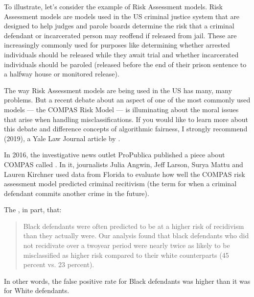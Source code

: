 \documentclass[letterpaper,10pt,english]{jupyterBook}
\begin{document}
\sphinxAtStartPar
To illustrate, let’s consider the example of Risk Assessment models. Risk Assessment models are models used in the US criminal justice system that are designed to help judges and parole boards determine the risk that a criminal defendant or incarcerated person may re\sphinxhyphen{}offend if released from jail. These are increasingly commonly used for purposes like determining whether arrested individuals should be released while they await trial and whether incarcerated individuals should be paroled (released before the end of their prison sentence to a half\sphinxhyphen{}way house or monitored release).

\sphinxAtStartPar
The way Risk Assessment models are being used in the US has many, many problems. But a recent debate about an aspect of one of the most commonly used models — the COMPAS Risk Model — is illuminating about the moral issues that arise when handling misclassifications. If you would like to learn more about this debate and difference concepts of algorithmic fairness, I strongly recommend  (2019), a Yale Law Journal article by .

\sphinxAtStartPar
In 2016, the investigative news outlet ProPublica published a piece about COMPAS called . In it, journalists Julia Angwin, Jeff Larson, Surya Mattu and Lauren Kirchner used data from Florida to evaluate how well the COMPAS risk assessment model predicted criminal recitivism (the term for when a criminal defendant commits another crime in the future).

\sphinxAtStartPar
The , in part, that:
\begin{quote}

\sphinxAtStartPar
Black defendants were often predicted to be at a higher risk of recidivism than they actually were. Our analysis found that black defendants who did not recidivate over a two\sphinxhyphen{}year period were nearly twice as likely to be misclassified as higher risk compared to their white counterparts (45 percent vs. 23 percent).
\end{quote}

\sphinxAtStartPar
In other words, the false positive rate for Black defendants was higher than it was for White defendants.
\end{document}
